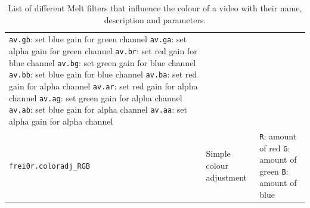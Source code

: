 \documentclass[../MasterThesis.tex]{subfiles}
\begin{document}
\begin{table}[H]
\begin{tabular}{lp{4.4cm}p{4.5cm}}
{		\texttt{av.gb}: set blue gain for green channel \newline 
		\texttt{av.ga}: set alpha gain for green channel \newline 
		\texttt{av.br}: set red gain for blue channel \newline 
		\texttt{av.bg}: set green gain for blue channel \newline 
		\texttt{av.bb}: set blue gain for blue channel \newline 
		\texttt{av.ba}: set red gain for alpha channel \newline 
		\texttt{av.ar}: set red gain for alpha channel \newline 
		\texttt{av.ag}: set green gain for alpha channel \newline 
		\texttt{av.ab}: set blue gain for alpha channel \newline 
		\texttt{av.aa}: set alpha gain for alpha channel}
		\\
		\texttt{frei0r.coloradj\_RGB} & Simple colour adjustment & 
		\tiny{
		\texttt{R}: amount of red \newline 
		\texttt{G}: amount of green \newline 
		\texttt{B}: amount of blue}
		\\
		\bottomrule
	\end{tabular}
	\caption[List of Melt filters that influence the colour of a video.]{List of different Melt filters that influence the colour of a video with their name, description and parameters.}
\end{table}






%
\end{document}
